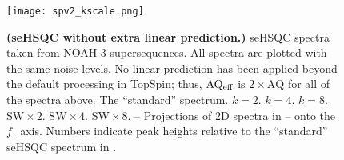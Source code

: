 \begin{figure}
    \centering
    \texttt{[image: spv2\_kscale.png]}
    {\label{fig:spv2_kscale_std}}
    {\label{fig:spv2_kscale_k2}}
    {\label{fig:spv2_kscale_k4}}
    {\label{fig:spv2_kscale_k8}}
    {\label{fig:spv2_kscale_sw2}}
    {\label{fig:spv2_kscale_sw4}}
    {\label{fig:spv2_kscale_sw8}}
    {\label{fig:spv2_kscale_std_proj}}
    {\label{fig:spv2_kscale_k2_proj}}
    {\label{fig:spv2_kscale_k4_proj}}
    {\label{fig:spv2_kscale_k8_proj}}
    {\label{fig:spv2_kscale_sw2_proj}}
    {\label{fig:spv2_kscale_sw4_proj}}
    {\label{fig:spv2_kscale_sw8_proj}}
    \caption{
        \textbf{(seHSQC without extra linear prediction.)}
        \nitrogen{} seHSQC spectra taken from NOAH-3  supersequences.
        All spectra are plotted with the same noise levels.
        No linear prediction has been applied beyond the default processing in TopSpin; thus, $\mathrm{AQ_{eff}}$ is $2 \times \mathrm{AQ}$ for all of the spectra above.
        \textbf{} The ``standard'' spectrum.
        \textbf{} $k = 2$.
        \textbf{} $k = 4$.
        \textbf{} $k = 8$.
        \textbf{} $\mathrm{SW} \times 2$.
        \textbf{} $\mathrm{SW} \times 4$.
        \textbf{} $\mathrm{SW} \times 8$.
        \textbf{}--\textbf{} Projections of 2D spectra in -- onto the $f_1$ axis.
        Numbers indicate peak heights relative to the ``standard'' seHSQC spectrum in .
        \grami{}
    }
    \label{fig:spv2_kscale}
\end{figure}

